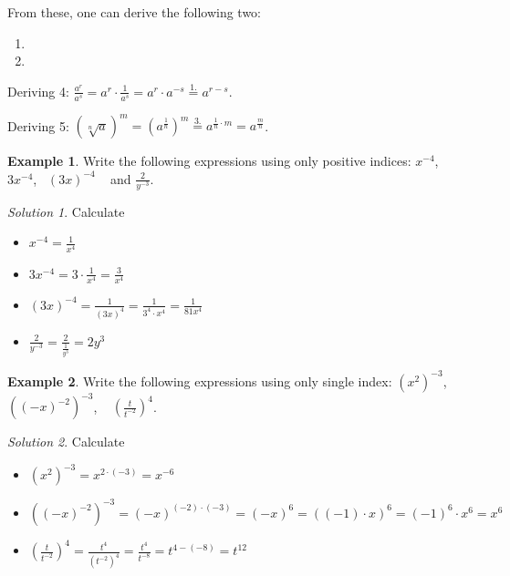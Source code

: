 \documentclass[
  12pt,
  oneside]{book}
\providecommand{\tightlist}{%
  \setlength{\itemsep}{0pt}\setlength{\parskip}{0pt}}
\theoremstyle{definition}
\theoremstyle{definition}
\newtheorem{example}{Example}[chapter]
\theoremstyle{definition}
\theoremstyle{definition}
\theoremstyle{remark}
\newtheorem*{solution}{Solution}
\begin{document}
From these, one can derive the following two:

\begin{enumerate}
\def\labelenumi{\arabic{enumi}.}
\setcounter{enumi}{3}
\item
\item
\end{enumerate}

Deriving 4: \(\frac{a^r}{a^s} = a^r\cdot \frac{1}{a^s} = a^r\cdot a^{-s} \stackrel{1.}{=} a^{r-s}\).

Deriving 5: \(\left(\sqrt[n]{a}\right)^m = \left(a^{\frac{1}{n}}\right)^m \stackrel{3.}{=} a^{\frac{1}{n}\cdot m} = a^\frac{m}{n}\).

\begin{example}
Write the following expressions using only positive indices: \(x^{-4}\),~ \(3x^{-4}\),~ \((3x)^{-4}\) ~ and \(\frac{2}{y^{-3}}\).
\end{example}

\begin{solution}

Calculate

\begin{itemize}
\tightlist
\item
  \(x^{-4}=\frac{1}{x^4}\)
\item
  \(3x^{-4}=3\cdot\frac{1}{x^4}=\frac{3}{x^4}\)
\item
  \((3x)^{-4} = \frac{1}{(3x)^4} = \frac{1}{3^4\cdot x^4}=\frac{1}{81x^4}\)
\item
  \(\frac{2}{y^{-3}}=\frac{2}{\frac{1}{y^3}}=2y^3\)
\end{itemize}

\end{solution}

\begin{example}
Write the following expressions using only single index: \(\left(x^2\right)^{-3}\), ~ \(\left((-x)^{-2}\right)^{-3}\), ~ \(\left(\frac{t}{t^{-2}}\right)^{4}\).
\end{example}

\begin{solution}

Calculate

\begin{itemize}
\tightlist
\item
  \(\left(x^2\right)^{-3} = x^{2\cdot(-3)}=x^{-6}\)
\item
  \(\left((-x)^{-2}\right)^{-3} = (-x)^{(-2)\cdot(-3)}=(-x)^{6}=\left((-1)\cdot x\right)^6=(-1)^6\cdot x^6=x^6\)
\item
  \(\left(\frac{t}{t^{-2}}\right)^{4}=\frac{t^4}{(t^{-2})^4}=\frac{t^4}{t^{-8}}=t^{4-(-8)}=t^{12}\)
\end{itemize}

\end{solution}
\end{document}
